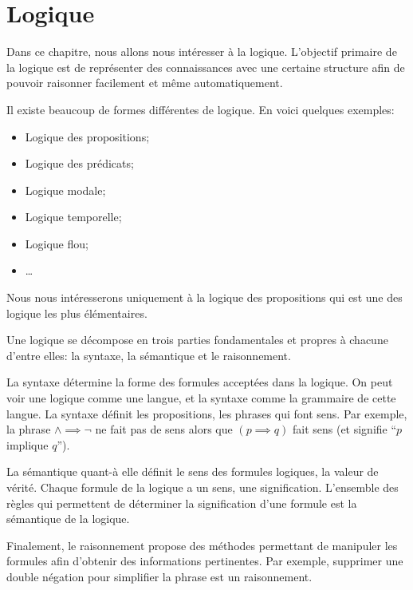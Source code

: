 \chapter{Logique}
Dans ce chapitre, nous allons nous intéresser à la logique. L'objectif primaire de la logique est de représenter des connaissances avec une certaine structure afin de pouvoir raisonner facilement et même automatiquement.
\smallskip

Il existe beaucoup de formes différentes de logique. En voici quelques exemples:
\begin{itemize}
\item Logique des propositions;
\item Logique des prédicats;
\item Logique modale;
\item Logique temporelle;
\item Logique flou;
\item \dots
\end{itemize}

Nous nous intéresserons uniquement à la logique des propositions qui est une des logique les plus élémentaires. 
\smallskip

Une logique se décompose en trois parties fondamentales et propres à chacune d'entre elles: la syntaxe, la sémantique et le raisonnement.
\smallskip

La syntaxe détermine la forme des formules acceptées dans la logique. On peut voir une logique comme une langue, et la syntaxe comme la grammaire de cette langue. La syntaxe définit les propositions, les phrases qui font sens. Par exemple, la phrase $\land\implies\neg$ ne fait pas de sens alors que $(p\implies q)$ fait sens (et signifie ``$p$ implique $q$'').
\smallskip

La sémantique quant-à elle définit le sens des formules logiques, la valeur de vérité. Chaque formule de la logique a un sens, une signification. L'ensemble des règles qui permettent de déterminer la signification d'une formule est la sémantique de la logique.
\smallskip

Finalement, le raisonnement propose des méthodes permettant de manipuler les formules afin d'obtenir des informations pertinentes. Par exemple, supprimer une double négation pour simplifier la phrase est un raisonnement.
\smallskip
